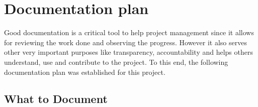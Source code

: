 \section{Documentation plan}
\label{section:documentation_plan}

Good documentation is a critical tool to help project management since it allows for reviewing the work done and observing the progress. However it also serves other very important purposes like transparency, accountability and helps others understand, use and contribute to the project. To this end, the following documentation plan was established for this project.

\subsection{What to Document}

